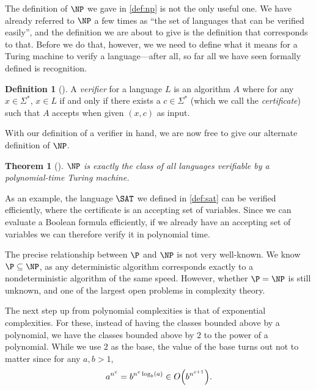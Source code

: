 \documentclass[english,12pt]{reedthesis}
\theoremstyle{plain}
\newtheorem{thm}{Theorem}[section]
\theoremstyle{definition}
\newtheorem{defn}[defn]{Definition}
\theoremstyle{remark}
\begin{document}
The definition of $\NP$ we gave in \cref{def:np} is not the only useful one.
We have already referred to $\NP$ a few times as ``the set of languages that can
be verified easily'', and the definition we are about to give is the definition
that corresponds to that. Before we do that, however, we we need to define what
it means for a Turing machine to verify a language---after all, so far all we have
seen formally defined is recognition.

\begin{defn}[{\cite[Def.\ 7.18]{Sip97}}]%
  \label{def:verifier}
  A \emph{verifier} for a language $L$ is an algorithm $A$ where for any
  $x \in \Sigma^{*}$, $x \in L$ if and only if there exists a $c \in \Sigma^{*}$ (which we call
  the \emph{certificate}) such that $A$ accepts when given $(x, c)$ as input.
\end{defn}

With our definition of a verifier in hand, we are now free to give our alternate
definition of $\NP$.

\begin{thm}[{\cite[Def.\ 7.19]{Sip97}}]\label{thm:np-verifier}
  $\NP$ is exactly the class of all languages verifiable by a polynomial-time
  Turing machine.
\end{thm}

As an example, the language $\SAT$ we defined in \cref{def:sat} can be verified
efficiently, where the certificate is an accepting set of variables. Since we
can evaluate a Boolean formula efficiently, if we already have an accepting set
of variables we can therefore verify it in polynomial time.

The precise relationship between $\P$ and $\NP$ is not very well-known. We know
$\P \subseteq \NP$, as any deterministic algorithm corresponds exactly to a
nondeterministic algorithm of the same speed. However, whether $\P = \NP$ is
still unknown, and one of the largest open problems in complexity theory.

The next step up from polynomial complexities is that of exponential
complexities. For these, instead of having the classes bounded above by a
polynomial, we have the classes bounded above by $2$ to the power of a
polynomial. While we use $2$ as the base, the value of the base turns out not to
matter since for any $a, b > 1$,
\begin{equation}
  a^{n^{c}} = b^{n^{c}\log_{b}(a)} \in O\mleft(b^{n^{c+1}}\mright).
\end{equation}
\end{document}
